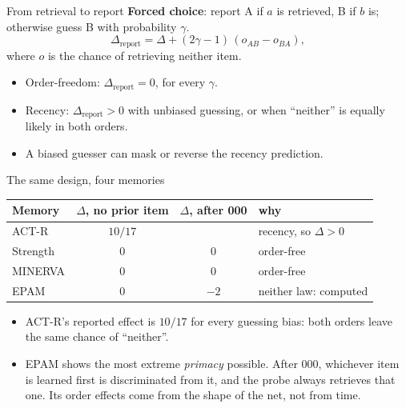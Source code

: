 \documentclass[aspectratio=169,11pt]{beamer}
\begin{document}
\begin{frame}{From retrieval to report}
  \textbf{Forced choice}: report A if $a$ is retrieved, B if $b$ is; otherwise guess B with probability $\gamma$.
  \[
  \Delta_{\text{report}} = \Delta + (2\gamma - 1)\,(o_{AB} - o_{BA}),
  \]
  where $o$ is the chance of retrieving neither item.
  \bigskip
  \begin{itemize}
    \item Order-freedom: $\Delta_{\text{report}} = 0$, for every $\gamma$.
    \item Recency: $\Delta_{\text{report}} > 0$ with unbiased guessing, or when ``neither'' is equally likely in both orders.
    \item A biased guesser can mask or reverse the recency prediction.
  \end{itemize}
\end{frame}

\begin{frame}{The same design, four memories}
  \small
  \begin{center}
  \begin{tabular}{lccl}
    \toprule
    Memory & $\Delta$, no prior item & $\Delta$, after 000 & why\\
    \midrule
    ACT-R & $10/17$ & & recency, so $\Delta > 0$\\
    Strength & $0$ & $0$ & order-free\\
    MINERVA & $0$ & $0$ & order-free\\
    EPAM & $0$ & $-2$ & neither law: computed\\
    \bottomrule
  \end{tabular}
  \end{center}
  \bigskip
  \normalsize
  \begin{itemize}
    \item ACT-R's reported effect is $10/17$ for every guessing bias: both orders leave the same chance of ``neither''.
    \item EPAM shows the most extreme \emph{primacy} possible. After 000, whichever item is learned first is discriminated from it, and the probe always retrieves that one. Its order effects come from the shape of the net, not from time.
  \end{itemize}
\end{frame}
\end{document}
